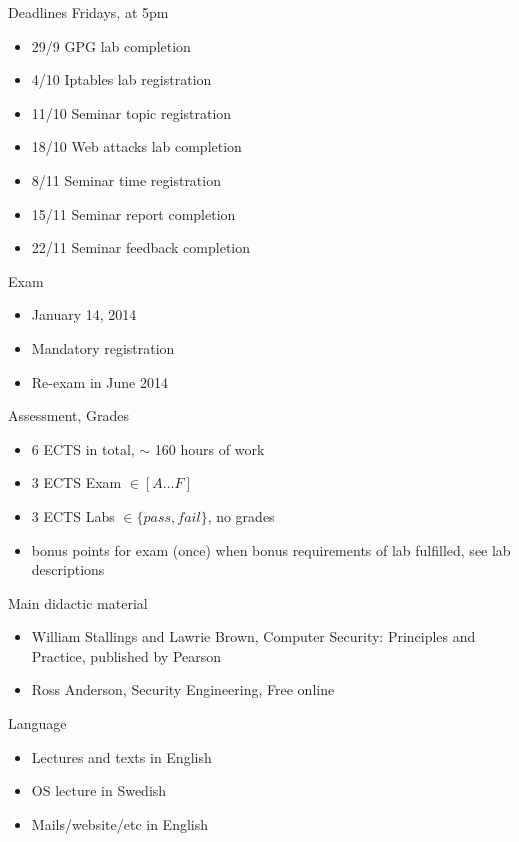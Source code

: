 \documentclass{beamer}
\begin{document}
\begin{frame}{Deadlines}
  Fridays, at 5pm
  \begin{itemize}
  \item 29/9 GPG lab completion 
  \item 4/10 Iptables lab registration 
  \item 11/10 Seminar topic registration 
  \item 18/10 Web attacks lab completion 
  \item 8/11 Seminar time registration 
  \item 15/11 Seminar report completion 
  \item 22/11 Seminar feedback completion
  \end{itemize}
\end{frame}

\begin{frame}{Exam}
  \begin{itemize}
  \item January 14, 2014
  \item \alert{Mandatory} registration 
  \item Re-exam in June 2014
  \end{itemize}
\end{frame}

\begin{frame}{Assessment, Grades}
  \begin{itemize}
  \item 6 ECTS in total, $\sim$ 160 hours of work 
  \item 3 ECTS Exam $\in [A \dots F]$
  \item 3 ECTS Labs $\in \{pass,fail\}$, no grades
  \item bonus points for exam (once) when bonus 
    requirements of lab fulfilled, see lab descriptions
  \end{itemize}
\end{frame}

\begin{frame}{Main didactic material}
  \begin{itemize}
  \item William Stallings and Lawrie Brown, Computer Security:
    Principles and Practice, published by Pearson 
  \item Ross Anderson, Security Engineering, Free online
  \end{itemize}
\end{frame}

\begin{frame}{Language}
  \begin{itemize}
  \item Lectures and texts in English
  \item OS lecture in Swedish
  \item Mails/website/etc in English
  \end{itemize}
\end{frame}
\end{document}

